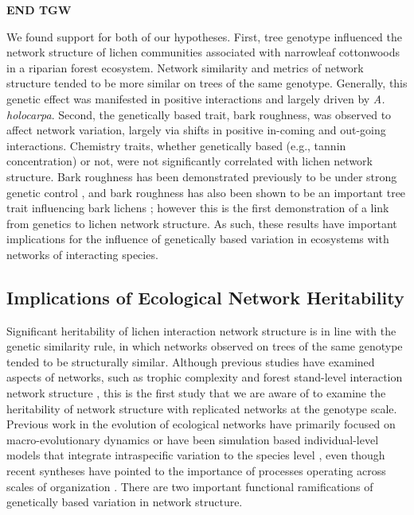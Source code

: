\documentclass[fleqn,12pt]{olplainarticle}
\begin{document}
\textbf{END TGW}



We found support for both of our hypotheses. First, tree genotype
influenced the network structure of lichen communities associated with
narrowleaf cottonwoods in a riparian forest ecosystem. Network
similarity and metrics of network structure tended to be more similar
on trees of the same genotype. Generally, this genetic effect was
manifested in positive interactions and largely driven by
\textit{A. holocarpa}. Second, the genetically based trait, bark
roughness, was observed to affect network variation, largely via
shifts in positive in-coming and out-going interactions. Chemistry
traits, whether genetically based (e.g., tannin concentration) or not,
were not significantly correlated with lichen network structure. Bark
roughness has been demonstrated previously to be under strong genetic
control \citep{Bdeir2017}, and bark roughness has also been shown to
be an important tree trait influencing bark lichens
\citep{Lamit2015a}; however this is the first demonstration of a link
from genetics to lichen network structure.  As such, these results
have important implications for the influence of genetically based
variation in ecosystems with networks of interacting species.


\subsection*{Implications of Ecological Network Heritability}

Significant heritability of lichen interaction network structure is in
line with the genetic similarity rule, in which networks observed on
trees of the same genotype tended to be structurally similar. Although
previous studies have examined aspects of networks, such as trophic
complexity \citep{Barbour2016GeneticComplexity} and forest stand-level
interaction network structure \citep{Lau2016GenotypicEvolution,
  Keith2017}, this is the first study that we are aware of to examine
the heritability of network structure with replicated networks at the
genotype scale. Previous work in the evolution of ecological networks
have primarily focused on macro-evolutionary dynamics
\citep{Rezende2007, Weber2017EvolutionMacroevolution,
  Valverde2018TheSpandrel, Harmon2019DetectingInteractions} or have
been simulation based individual-level models that integrate
intraspecific variation to the species level
\citep{Maliet2020AnNetworks}, even though recent syntheses have
pointed to the importance of processes operating across scales of
organization \citep{Guimaraes2020TheOrganization}. There are two
important functional ramifications of genetically based variation in
network structure.
\end{document}
